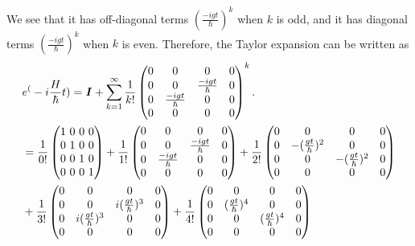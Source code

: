 \documentclass{article}
\begin{document}
We see that it has off-diagonal terms $(\frac{-igt}{\hbar})^k$ when
$k$ is odd, and it has diagonal terms $(\frac{-igt}{\hbar})^k$ when 
$k$ is even. Therefore, the Taylor expansion can be written as
\begin{align} \label{eq 4.29}
    \begin{split}
        &e^(-i\frac{H}{\hbar}t) = \textbf{\textit{I}}+\sum_{k=1}^{\infty}\frac{1}{k!}\begin{pmatrix}
            0 & 0& 0& 0\\ 0& 0& \frac{-igt}{\hbar}& 0\\
            0& \frac{-igt}{\hbar}& 0& 0\\ 0& 0& 0& 0
        \end{pmatrix}^k.\\
        &=\frac{1}{0!}\begin{pmatrix}
            1 \ 0\ 0\ 0\\ 0\ 1\ 0\ 0\\
            0\ 0\ 1\ 0\\ 0\ 0\ 0\ 1
        \end{pmatrix}
        +\frac{1}{1!}\begin{pmatrix}
             0 & 0& 0& 0\\ 0& 0& \frac{-igt}{\hbar}& 0\\
            0& \frac{-igt}{\hbar}& 0& 0\\ 0& 0& 0& 0
        \end{pmatrix}
        +\frac{1}{2!}\begin{pmatrix}
            0& 0& 0& 0\\0&  -(\frac{gt}{\hbar})^2& 0& 0\\
            0& 0& -(\frac{gt}{\hbar})^2&  0\\ 0& 0& 0& 0
        \end{pmatrix}\\
        &+\frac{1}{3!}\begin{pmatrix}
            0& 0& 0& 0\\0& 0& i(\frac{gt}{\hbar})^3& 0\\
            0& i(\frac{gt}{\hbar})^3& 0& 0\\ 0& 0& 0& 0
        \end{pmatrix}
        +\frac{1}{4!}\begin{pmatrix}
            0& 0& 0& 0\\0&  (\frac{gt}{\hbar})^4& 0& 0\\
            0& 0& (\frac{gt}{\hbar})^4&  0\\ 0& 0& 0& 0

\end{pmatrix}
\end{split}
\end{align}
\end{document}
